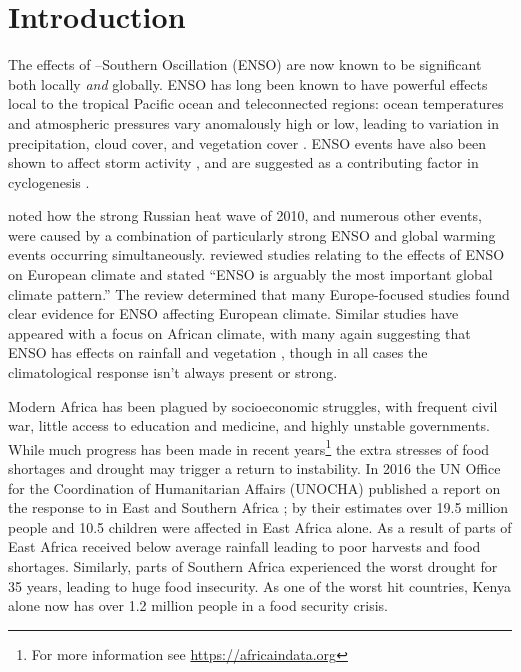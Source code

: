 \section{Introduction}

The effects of \elnino{}--Southern Oscillation (ENSO) are now known to be
significant both locally \emph{and} globally. ENSO has long been known to have
powerful effects local to the tropical Pacific ocean and teleconnected regions:
ocean temperatures and atmospheric pressures vary anomalously high or low,
leading to variation in precipitation, cloud cover, and vegetation cover
\citep{philander1990}. ENSO events have also been shown to affect storm activity
\citep{wang2002}, and are suggested as a contributing factor in cyclogenesis
\citep{sobel2000}.

\cite{trenberth2012} noted how the strong Russian heat wave of 2010, and
numerous other events, were caused by a combination of particularly strong ENSO
and global warming events occurring simultaneously. \cite{bronnimann2007}
reviewed studies relating to the effects of ENSO on European climate and stated
``ENSO is arguably the most important global climate pattern.'' The review
determined that many Europe-focused studies found clear evidence for ENSO
affecting European climate. Similar studies have appeared with a focus on
African climate, with many again suggesting that ENSO has effects on rainfall
\citep{kane2009} and vegetation \citep{anyamba1996, anyamba2001, anyamba2002},
though in all cases the climatological response isn't always present or strong.

\vspace{0.5cm}

Modern Africa has been plagued by socioeconomic struggles, with frequent civil
war, little access to education and medicine, and highly unstable
governments. While much progress has been made in recent years\footnote{For more
  information see \url{https://africaindata.org}} the extra stresses of food
shortages and drought may trigger a return to instability.
In 2016 the UN Office for the Coordination of Humanitarian Affairs (UNOCHA)
published a report on the response to \elnino{} in East and Southern Africa
\citep{unocha2016}; by their estimates over 19.5 million people and 10.5
children were affected in East Africa alone. As a result of \elnino{} parts of
East Africa received below average rainfall leading to poor harvests and food
shortages. Similarly, parts of Southern Africa experienced the worst drought for
35 years, leading to huge food insecurity. As one of the worst hit countries,
Kenya alone now has over 1.2 million people in a food security crisis.

